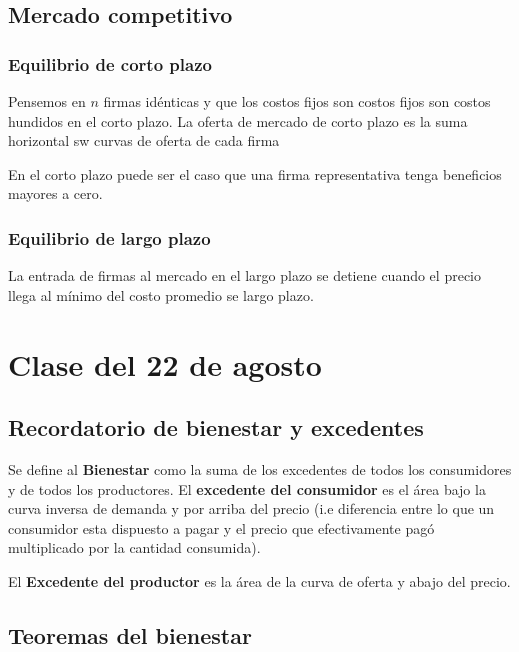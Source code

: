 \documentclass[letterpaper,12pt,twocolumn]{report}
\begin{document}
\subsection*{Mercado competitivo}

\subsubsection*{Equilibrio de corto plazo}

Pensemos en $n$ firmas idénticas y que los costos fijos son costos fijos son costos hundidos en el corto plazo. La oferta de mercado de corto plazo es la suma horizontal sw curvas de oferta de cada firma


En el corto plazo puede ser el caso que una firma representativa tenga beneficios mayores a cero.

\subsubsection*{Equilibrio de largo plazo}

La entrada de firmas al mercado en el largo plazo se detiene cuando el precio llega al mínimo del costo promedio se largo plazo.


\section{Clase del 22 de agosto}


\subsection*{Recordatorio de bienestar y excedentes}

Se define al \textbf{Bienestar} como la suma de los excedentes de todos los consumidores y de todos los productores. El \textbf{excedente del consumidor} es el área bajo la curva inversa de demanda y por arriba del precio (i.e diferencia entre lo que un consumidor esta dispuesto a pagar y el precio que efectivamente pagó multiplicado por la cantidad consumida).


El \textbf{Excedente del productor} es la área de la curva de oferta y abajo del precio.



\subsection*{Teoremas del bienestar}
\end{document}
